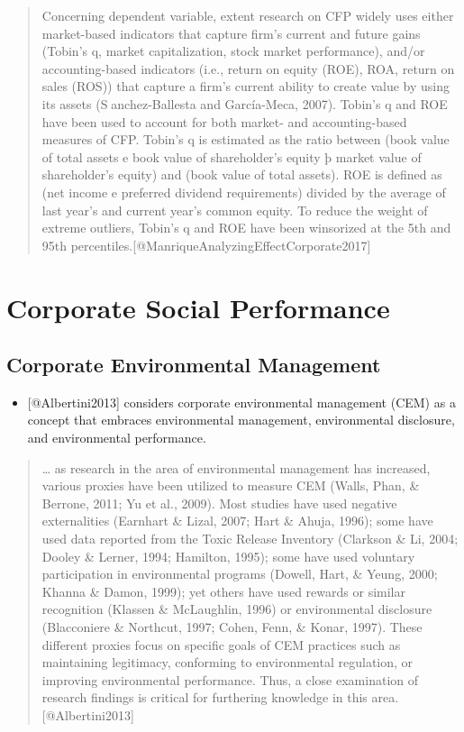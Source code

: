 \documentclass[]{article}
\providecommand{\tightlist}{%
  \setlength{\itemsep}{0pt}\setlength{\parskip}{0pt}}
\begin{document}
\begin{quote}
Concerning dependent variable, extent research on CFP widely uses either
market-based indicators that capture firm's current and future gains
(Tobin's q, market capitalization, stock market performance), and/or
accounting-based indicators (i.e., return on equity (ROE), ROA, return
on sales (ROS)) that capture a firm's current ability to create value by
using its assets (Sanchez-Ballesta and García-Meca, 2007). Tobin's q
and ROE have been used to account for both market- and accounting-based
measures of CFP. Tobin's q is estimated as the ratio between (book value
of total assets e book value of shareholder's equity þ market value of
shareholder's equity) and (book value of total assets). ROE is defined
as (net income e preferred dividend requirements) divided by the average
of last year's and current year's common equity. To reduce the weight of
extreme outliers, Tobin's q and ROE have been winsorized at the 5th and
95th percentiles.{[}@ManriqueAnalyzingEffectCorporate2017{]}
\end{quote}

\section{Corporate Social
Performance}\label{corporate-social-performance}

\subsection{Corporate Environmental
Management}\label{corporate-environmental-management}

\begin{itemize}
\tightlist
\item
  {[}@Albertini2013{]} considers corporate environmental management
  (CEM) as a concept that embraces environmental management,
  environmental disclosure, and environmental performance.
\end{itemize}

\begin{quote}
\ldots{} as research in the area of environmental management has
increased, various proxies have been utilized to measure CEM (Walls,
Phan, \& Berrone, 2011; Yu et al., 2009). Most studies have used
negative externalities (Earnhart \& Lizal, 2007; Hart \& Ahuja, 1996);
some have used data reported from the Toxic Release Inventory (Clarkson
\& Li, 2004; Dooley \& Lerner, 1994; Hamilton, 1995); some have used
voluntary participation in environmental programs (Dowell, Hart, \&
Yeung, 2000; Khanna \& Damon, 1999); yet others have used rewards or
similar recognition (Klassen \& McLaughlin, 1996) or environmental
disclosure (Blacconiere \& Northcut, 1997; Cohen, Fenn, \& Konar, 1997).
These different proxies focus on specific goals of CEM practices such as
maintaining legitimacy, conforming to environmental regulation, or
improving environmental performance. Thus, a close examination of
research findings is critical for furthering knowledge in this
area.{[}@Albertini2013{]}
\end{quote}
\end{document}
